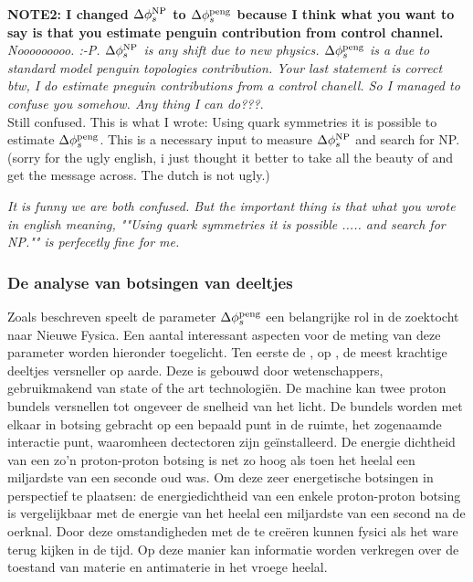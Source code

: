 \textbf{NOTE2: I changed $\Delta\phi_{s}^{\tiny \text{NP}}$  to $\Delta\phi_{s}^{\tiny\text{peng}}$ because I think what
you want to say is that you estimate penguin contribution from control channel. }\\

{\color{green}\it Nooooooooo. :-P. $\Delta\phi_{s}^{\tiny \text{NP}}$ is any shift due to new physics.
$\Delta\phi_{s}^{\tiny\text{peng}}$ is a due to standard model penguin topologies contribution. Your last statement
is correct btw, I do estimate pneguin contributions from a control chanell. So I managed to confuse
you somehow. Any thing I can do???}.\\

{\color{red} Still confused. This is what I wrote:
Using quark symmetries it is possible to estimate $\Delta\phi_{s}^{\tiny\text{peng}}$.
This is a necessary input to measure  $\Delta\phi_{s}^{\tiny \text{NP}}$
and search for NP. (sorry for the ugly english, i just thought it better to take all the beauty of and get
the message across. The dutch is not ugly.)}

{\color{green}\it It is funny we are both confused. But the important thing is that what you wrote in english
meaning, ""Using quark symmetries it is possible ..... and search for NP."" is perfecetly fine for me.}


\subsubsection{De analyse van botsingen van deeltjes}
Zoals beschreven speelt de parameter $\Delta\phi_{s}^{\tiny\text{peng}}$ een belangrijke rol in de zoektocht naar Nieuwe Fysica. Een aantal interessant aspecten voor de meting van deze parameter worden hieronder toegelicht. Ten eerste de \lhc, op \cern, de meest krachtige deeltjes versneller op aarde. Deze is gebouwd door wetenschappers, gebruikmakend van state of the art technologi\"en. De machine kan twee proton bundels versnellen tot ongeveer de snelheid van het licht. De bundels worden met elkaar in botsing gebracht op een bepaald punt in de ruimte, het zogenaamde interactie punt, waaromheen dectectoren zijn ge\"installeerd. De energie dichtheid van een zo'n proton-proton botsing is net zo hoog als toen het heelal een miljardste van een seconde oud was. Om deze zeer energetische botsingen in perspectief te plaatsen: de energiedichtheid van een enkele proton-proton botsing is vergelijkbaar met de energie van het heelal een miljardste van een second na de oerknal. Door deze omstandigheden met de \lhc te cre\"eren kunnen fysici als het ware terug kijken  in de tijd. Op deze manier kan informatie worden verkregen over de toestand van materie en antimaterie in het vroege heelal.

